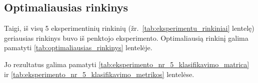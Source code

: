 \subsection{Optimaliausias rinkinys}
\label{subsec:optimaliausias_rinkinys}

Taigi, iš visų 5 eksperimentinių rinkinių (žr.~\ref{tab:eksperimentu_rinkiniai} lentelę) geriausias rinkinys buvo iš penktojo eksperimento. Optimaliausią rinkinį galima pamatyti \ref{tab:optimaliausias_rinkinys} lentelėje.


Jo rezultatus galima pamatyti \ref{tab:eksperimento_nr_5_klasifikavimo_matrica} ir \ref{tab:eksperimento_nr_5_klasifikavimo_metrikos} lentelėse.